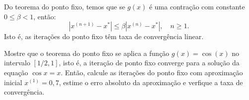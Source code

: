\begin{obs}
  Do teorema do ponto fixo, temos que se $g(x)$ é uma contração com constante $0\leq \beta < 1$, então:
  \begin{equation*}
    |x^{(n+1)}-x^*| \leq \beta |x^{(n)}-x^*|,\quad n\geq 1.
  \end{equation*}
Isto é, as iterações do ponto fixo têm taxa de convergência linear.
\end{obs}

\begin{ex}\label{ex:ponto_fixo_3}
Mostre que o teorema do ponto fixo se aplica a função $g(x) = \cos(x)$ no intervalo $[1/2, 1]$, isto é, a iteração de ponto fixo converge para a solução da equação $\cos x = x$. Então, calcule as iterações do ponto fixo com aproximação inicial $x^{(1)} = 0,7$, estime o erro absoluto da aproximação e verfique a taxa de convergência.
\end{ex}
